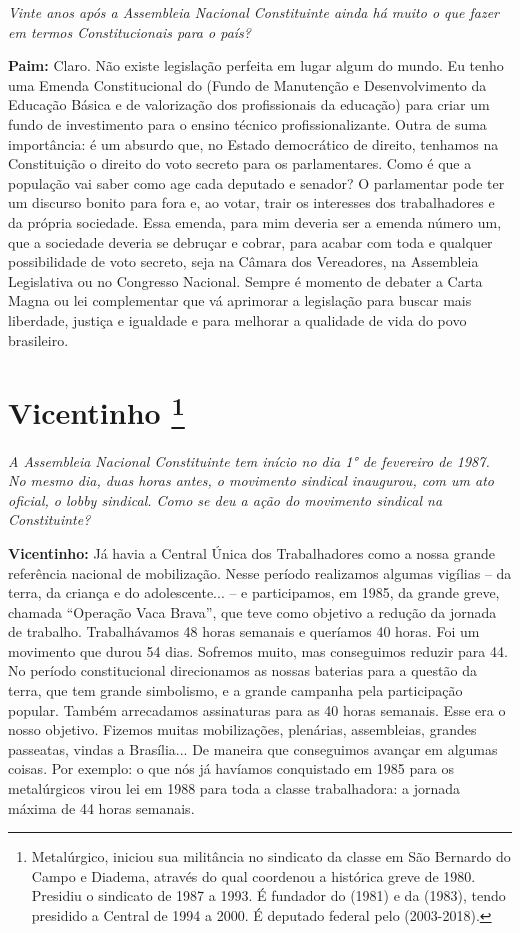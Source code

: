 \emph{Vinte anos após a Assembleia Nacional Constituinte ainda há
muito o que fazer em termos Constitucionais para o país?}

\textbf{Paim:} Claro. Não existe legislação perfeita em lugar algum do
mundo. Eu tenho uma Emenda Constitucional do  (Fundo de Manutenção
e Desenvolvimento da Educação Básica e de valorização dos profissionais
da educação) para criar um fundo de investimento para o ensino técnico
profissionalizante. Outra de suma importância: é um absurdo que, no
Estado democrático de direito, tenhamos na Constituição o direito do
voto secreto para os parlamentares. Como é que a população vai saber
como age cada deputado e senador? O parlamentar pode ter um discurso
bonito para fora e, ao votar, trair os interesses dos trabalhadores e da
própria sociedade. Essa emenda, para mim deveria ser a emenda número um,
que a sociedade deveria se debruçar e cobrar, para acabar com toda e
qualquer possibilidade de voto secreto, seja na Câmara dos Vereadores,
na Assembleia Legislativa ou no Congresso Nacional. Sempre é momento de
debater a Carta Magna ou lei complementar que vá aprimorar a legislação
para buscar mais liberdade, justiça e igualdade e para melhorar a
qualidade de vida do povo brasileiro.

\chapter{Vicentinho
\footnote{​Metalúrgico, iniciou sua militância no sindicato da classe em São
Bernardo do Campo e Diadema, através do qual coordenou a histórica greve
de 1980. Presidiu o sindicato de 1987 a 1993. É fundador do  (1981) e
da  (1983), tendo presidido a Central de 1994 a 2000. É deputado
federal pelo  (2003-2018).}}

\emph{A Assembleia Nacional Constituinte tem início no dia 1° de
fevereiro de 1987. No mesmo dia, duas horas antes, o movimento sindical
inaugurou, com um ato oficial, o lobby sindical. Como se deu a ação do
movimento sindical na Constituinte?}

\textbf{Vicentinho:} Já havia a Central Única dos Trabalhadores como a
nossa grande referência nacional de mobilização. Nesse período
realizamos algumas vigílias -- da terra, da criança e do adolescente...
-- e participamos, em 1985, da grande greve, chamada ``Operação Vaca
Brava'', que teve como objetivo a redução da jornada de trabalho.
Trabalhávamos 48 horas semanais e queríamos 40 horas. Foi um movimento
que durou 54 dias. Sofremos muito, mas conseguimos reduzir para 44. No
período constitucional direcionamos as nossas baterias para a questão da
terra, que tem grande simbolismo, e a grande campanha pela participação
popular. Também arrecadamos assinaturas para as 40 horas semanais. Esse
era o nosso objetivo. Fizemos muitas mobilizações, plenárias,
assembleias, grandes passeatas, vindas a Brasília... De maneira que
conseguimos avançar em algumas coisas. Por exemplo: o que nós já
havíamos conquistado em 1985 para os metalúrgicos virou lei em 1988 para
toda a classe trabalhadora: a jornada máxima de 44 horas semanais.

